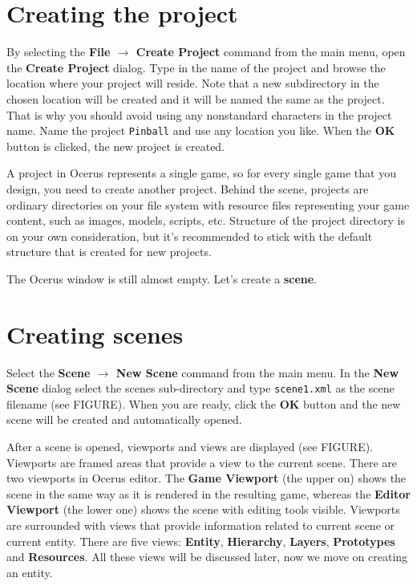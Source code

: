 \documentclass[a4paper,12pt]{article}
\begin{document}
\section{Creating the project}
By selecting the \textbf{File $\to$ Create Project} command from the main menu, open the \textbf{Create Project} dialog. Type in the name of the project and browse the location where your project will reside. Note that a new subdirectory in the chosen location will be created and it will be named the same as the project. That is why you should avoid using any nonstandard characters in the project name. Name the project \texttt{Pinball} and use any location you like. When the \textbf{OK} button is clicked, the new project is created.

A project in Ocerus represents a single game, so for every single game that you design, you need to create another project. Behind the scene, projects are ordinary directories on your file system with resource files representing your game content, such as images, models, scripts, etc. Structure of the project directory is on your own consideration, but it's recommended to stick with the default structure that is created for new projects.

The Ocerus window is still almost empty. Let's create a \textbf{scene}.

\section{Creating scenes}
Select the \textbf{Scene $\to$ New Scene} command from the main menu. In the \textbf{New Scene} dialog select the scenes sub-directory and type \texttt{scene1.xml} as the scene filename (see FIGURE). When you are ready, click the \textbf{OK} button and the new scene will be created and automatically opened.

After a scene is opened, viewports and views are displayed (see FIGURE). Viewports are framed areas that provide a view to the current scene. There are two viewports in Ocerus editor. The \textbf{Game Viewport} (the upper on) shows the scene in the same way as it is rendered in the resulting game, whereas the \textbf{Editor Viewport} (the lower one) shows the scene with editing tools visible. Viewports are surrounded with views that provide information related to current scene or current entity. There are five views: \textbf{Entity}, \textbf{Hierarchy}, \textbf{Layers}, \textbf{Prototypes} and \textbf{Resources}. All these views will be discussed later, now we move on creating an entity.
\end{document}
